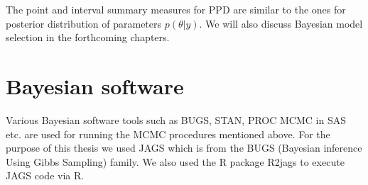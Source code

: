 The point and interval summary measures for PPD are similar to the ones for posterior distribution of parameters $p(\theta|y)$. We will also discuss Bayesian model selection in the forthcoming chapters.

\section{Bayesian software}
Various Bayesian software tools such as BUGS, STAN, PROC MCMC in SAS etc. are used for running the MCMC procedures mentioned above. For the purpose of this thesis we used JAGS which is from the BUGS (Bayesian inference Using Gibbs Sampling) family. We also used the R package R2jags to execute JAGS code via R.